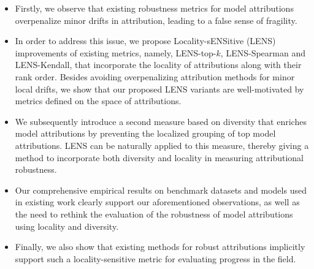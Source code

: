 \documentclass[letterpaper]{article} %
\begin{document}
\begin{itemize}[leftmargin=*]
\setlength\itemsep{-0.06em}
\item Firstly, we observe that existing robustness metrics for model attributions overpenalize minor drifts in attribution, leading to a false sense of fragility. %
\item In order to address this issue, we propose Locality-sENSitive (LENS) improvements of existing metrics, namely, LENS-top-$k$, LENS-Spearman and LENS-Kendall, that incorporate the locality of attributions along with their rank order. Besides avoiding overpenalizing attribution methods for minor local drifts, we show that our proposed LENS variants are well-motivated by metrics defined on the space of attributions. %
\item We subsequently introduce a second measure based on diversity that enriches model attributions by preventing the localized grouping of top model attributions. LENS can be naturally applied to this measure, thereby giving a method to incorporate both diversity and locality in measuring attributional robustness. 
\item Our comprehensive empirical results on benchmark datasets and models used in existing work clearly support our aforementioned observations, as well as the need to rethink the evaluation of the robustness of model attributions using locality and diversity. 
\item Finally, we also show that existing methods for robust attributions implicitly support such a locality-sensitive metric for evaluating progress in the field. 
\end{itemize}
%
\end{document}
